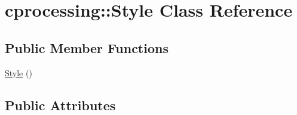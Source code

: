 \hypertarget{classcprocessing_1_1Style}{\section{cprocessing\-:\-:\-Style \-Class \-Reference}
\label{classcprocessing_1_1Style}
}
\subsection*{\-Public \-Member \-Functions}
\begin{DoxyCompactItemize}
\item 
\hyperlink{classcprocessing_1_1Style_a914f187818eb30c0cebe3df5378bfa0a}{\-Style} ()
\end{DoxyCompactItemize}
\subsection*{\-Public \-Attributes}
